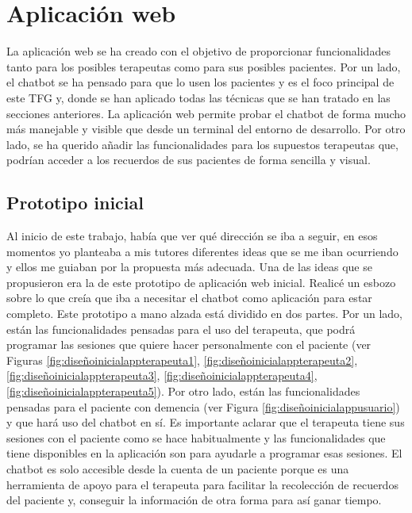 \section{Aplicación web}

La aplicación web se ha creado con el objetivo de proporcionar funcionalidades tanto para los posibles terapeutas como para sus posibles pacientes. Por un lado, el chatbot se ha pensado para que lo usen los pacientes y es el foco principal de este TFG y, donde se han aplicado todas las técnicas que se han tratado en las secciones anteriores. La aplicación web permite probar el chatbot de forma mucho más manejable y visible que desde un terminal del entorno de desarrollo. Por otro lado, se ha querido añadir las funcionalidades para los supuestos terapeutas que, podrían acceder a los recuerdos de sus pacientes de forma sencilla y visual.

\subsection{Prototipo inicial}

Al inicio de este trabajo, había que ver qué dirección se iba a seguir, en esos momentos yo planteaba a mis tutores diferentes ideas que se me iban ocurriendo y ellos me guiaban por la propuesta más adecuada. Una de las ideas que se propusieron era la de este prototipo de aplicación web inicial. Realicé un esbozo sobre lo que creía que iba a necesitar el chatbot como aplicación para estar completo. Este prototipo a mano alzada está dividido en dos partes. Por un lado, están las funcionalidades pensadas para el uso del terapeuta, que podrá programar las sesiones que quiere hacer personalmente con el paciente (ver Figuras \ref{fig:diseñoinicialappterapeuta1}, \ref{fig:diseñoinicialappterapeuta2}, \ref{fig:diseñoinicialappterapeuta3}, \ref{fig:diseñoinicialappterapeuta4}, \ref{fig:diseñoinicialappterapeuta5}). Por otro lado, están las funcionalidades pensadas para el paciente con demencia (ver Figura \ref{fig:diseñoinicialappusuario}) y que hará uso del chatbot en sí. Es importante aclarar que el terapeuta tiene sus sesiones con el paciente como se hace habitualmente y las funcionalidades que tiene disponibles en la aplicación son para ayudarle a programar esas sesiones. El chatbot es solo accesible desde la cuenta de un paciente porque es una herramienta de apoyo para el terapeuta para facilitar la recolección de recuerdos del paciente y, conseguir la información de otra forma para así ganar tiempo.

